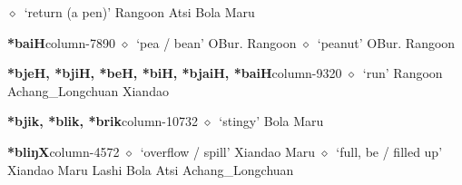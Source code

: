 \hspace{1ex}
         $\diamond$~`return (a pen)'
         Rangoon 
\hspace{1ex}
         Atsi 
\hspace{1ex}
         Bola 
\hspace{1ex}
         Maru 
  \item {\footnotesize \textbf{*baiH}}{\tiny column-7890}
         $\diamond$~`pea / bean'
         OBur. 
\hspace{1ex}
         Rangoon 
\hspace{1ex}
         $\diamond$~`peanut'
         OBur. 
\hspace{1ex}
         Rangoon 
  \item {\footnotesize \textbf{*bjeH, *bjiH, *beH, *biH, *bjaiH, *baiH}}{\tiny column-9320}
         $\diamond$~`run'
         Rangoon 
\hspace{1ex}
         Achang\_Longchuan 
\hspace{1ex}
         Xiandao 
  \item {\footnotesize \textbf{*bjik, *blik, *brik}}{\tiny column-10732}
         $\diamond$~`stingy'
         Bola 
\hspace{1ex}
         Maru 
  \item {\footnotesize \textbf{*bliŋX}}{\tiny column-4572}
         $\diamond$~`overflow / spill'
         Xiandao 
\hspace{1ex}
         Maru 
\hspace{1ex}
         $\diamond$~`full, be / filled up'
         Xiandao 
\hspace{1ex}
         Maru 
\hspace{1ex}
         Lashi 
\hspace{1ex}
         Bola 
\hspace{1ex}
         Atsi 
\hspace{1ex}
         Achang\_Longchuan 
\hspace{1ex}
